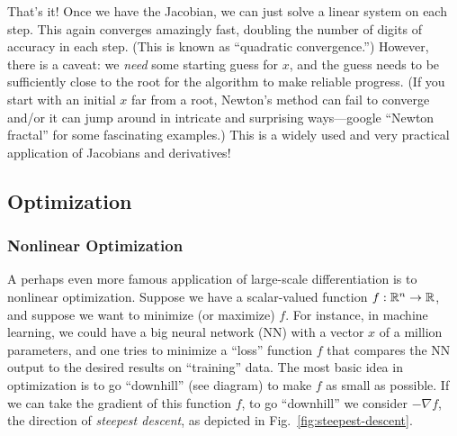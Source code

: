 That's it! Once we have the Jacobian, we can just solve a linear system on each step. This again converges amazingly fast, doubling the number of digits of accuracy in each step. (This is known as ``quadratic convergence.'') However, there is a caveat: we \textit{need} some starting guess for $x$, and the guess needs to be sufficiently close to the root for the algorithm to make reliable progress. (If you start with an initial $x$ far from a root, Newton's method can fail to converge and/or it can jump around in intricate and surprising ways---google ``Newton fractal'' for some fascinating examples.) This is a widely used and very practical application of Jacobians and derivatives!

\subsection{Optimization}

\subsubsection{Nonlinear Optimization}
A perhaps even more famous application of large-scale differentiation is to nonlinear optimization. Suppose we have a scalar-valued function $f: \mathbb R^n \to \mathbb R$, and suppose we want to minimize (or maximize) $f$. For instance, in machine learning, we could have a big neural network (NN) with a vector $x$ of a million parameters, and one tries to minimize a ``loss'' function $f$ that compares the NN output to the desired results on ``training'' data. The most basic idea in optimization is to go ``downhill'' (see diagram) to make $f$ as small as possible. If we can take the gradient of this function $f$, to go ``downhill'' we consider $- \nabla f$, the direction of \emph{steepest descent}, as depicted in Fig.~\ref{fig:steepest-descent}. 

